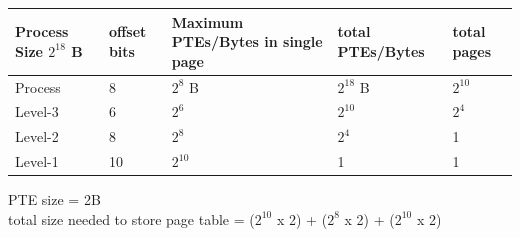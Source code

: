 \begin{enumerate}
\begin{minipage}{\linewidth}
    \begin{myTableStyle}
      \begin{tabular}{ |m{2cm}|m{2cm}|m{2cm}|m{2cm}|m{2cm}| } \hline
          Process Size \(2^{18}\) B  & offset bits & Maximum PTEs/Bytes in single page & total PTEs/Bytes  & total pages\\ \hline
          Process   &   8   &  \(2^8\) B      &   \(2^{18}\) B&   \(2^{10}\)    \\ \hline
          Level-3   &   6   &  \(2^6\)        &   \(2^{10}\)  &   \(2^{4}\)     \\ \hline
          Level-2   &   8   &  \(2^8\)        &   \(2^{4}\)   &   1             \\ \hline
          Level-1   &   10  &  \(2^{10}\)     &   1           &   1             \\ \hline
      \end{tabular}
    \end{myTableStyle}

    PTE size =  2B \\
    total size needed to store page table = (\(2^{10}\) x 2)  + (\(2^{8}\) x 2)  + (\(2^{10}\) x 2)
    \vspace{0.08in}
  \end{minipage}





\end{enumerate}








